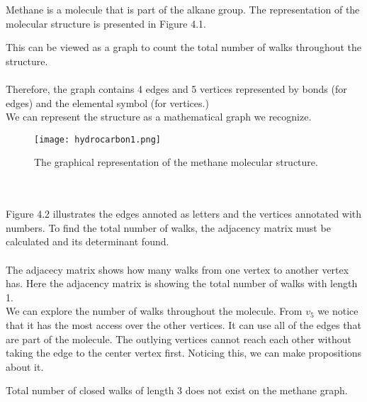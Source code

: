   Methane is a molecule that is part of the alkane group.  The representation of the molecular structure is presented in Figure 4.1.  
   \par This can be viewed as a graph to count the total number of walks throughout the structure.
  \\
  \\Therefore, the graph contains 4 edges and 5 vertices represented by bonds (for edges) and the elemental symbol (for vertices.)
  \\We can represent the structure as a mathematical graph we recognize.
 \begin{figure}[h]
     \centering
     \texttt{[image: hydrocarbon1.png]}
     \caption{\small{The graphical representation of the methane molecular structure.}}
 \end{figure}
 \\
 \\Figure 4.2 illustrates the edges annoted as letters and the vertices annotated with numbers. To find the total number of walks, the adjacency matrix must be calculated and its determinant found.
\\\\The adjacecy matrix shows how many walks from one vertex to another vertex has.  Here the adjacency matrix is showing the total number of walks with length 1.\\
We can explore the number of walks throughout the molecule. From $v_5$ we notice that it has the most access over the other vertices. It can use all of the edges that are part of the molecule.  The outlying vertices cannot reach each other without taking the edge to the center vertex first.  Noticing this, we can make propositions about it. 
\begin{proposition}
    Total number of closed walks of length 3 does not exist on the methane graph.
\end{proposition}
